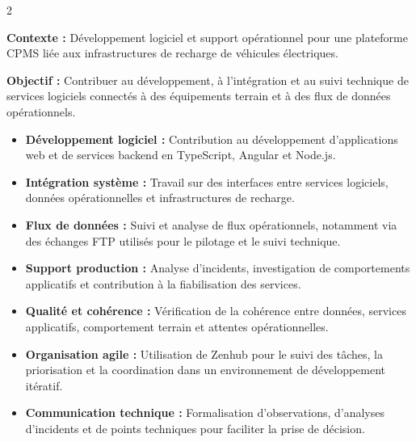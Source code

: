 \documentclass[8pt,a4paper,ragged2e,withhyper]{../_shared/altacv}
\begin{document}



\makecvheader
\vspace{-0.3cm}


\begin{paracol}{2}



\textbf{Contexte :} Développement logiciel et support opérationnel pour une plateforme CPMS liée aux infrastructures de recharge de véhicules électriques.

\textbf{Objectif :} Contribuer au développement, à l'intégration et au suivi technique de services logiciels connectés à des équipements terrain et à des flux de données opérationnels.

\begin{itemize}
  \item \textbf{Développement logiciel :} Contribution au développement d'applications web et de services backend en TypeScript, Angular et Node.js.
  \item \textbf{Intégration système :} Travail sur des interfaces entre services logiciels, données opérationnelles et infrastructures de recharge.
  \item \textbf{Flux de données :} Suivi et analyse de flux opérationnels, notamment via des échanges FTP utilisés pour le pilotage et le suivi technique.
  \item \textbf{Support production :} Analyse d'incidents, investigation de comportements applicatifs et contribution à la fiabilisation des services.
  \item \textbf{Qualité et cohérence :} Vérification de la cohérence entre données, services applicatifs, comportement terrain et attentes opérationnelles.
  \item \textbf{Organisation agile :} Utilisation de Zenhub pour le suivi des tâches, la priorisation et la coordination dans un environnement de développement itératif.
  \item \textbf{Communication technique :} Formalisation d'observations, d'analyses d'incidents et de points techniques pour faciliter la prise de décision.
\end{itemize}


\end{paracol}
\end{document}
